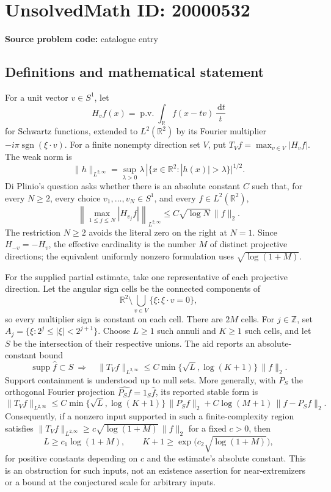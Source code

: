 \documentclass[11pt]{article}
\newcommand{\Z}{\mathbb{Z}}
\newcommand{\R}{\mathbb{R}}
\newcommand{\dd}{\,\mathrm{d}}
\begin{document}
\section*{UnsolvedMath ID: 20000532}
\textbf{Source problem code:} catalogue entry
\subsection{Definitions and mathematical statement}
For a unit vector \(v\in S^1\), let
\[
 H_vf(x)=\operatorname{p.v.}\int_\R f(x-tv)\,\frac{\dd t}{t}
\]
for Schwartz functions, extended to \(L^2(\R^2)\) by its Fourier multiplier \(-i\pi\operatorname{sgn}(\xi\cdot v)\). For a finite nonempty direction set \(V\), put \(T_Vf=\max_{v\in V}|H_vf|\). The weak norm is
\[
 \|h\|_{L^{2,\infty}}=\sup_{\lambda>0}\lambda\,|\{x\in\R^2:|h(x)|>\lambda\}|^{1/2}.
\]
Di Plinio's question asks whether there is an absolute constant \(C\) such that, for every \(N\geq2\), every choice \(v_1,\ldots,v_N\in S^1\), and every \(f\in L^2(\R^2)\),
\[
 \left\|\max_{1\leq j\leq N}|H_{v_j}f|\right\|_{L^{2,\infty}}\leq C\sqrt{\log N}\,\|f\|_2.
\]
The restriction \(N\geq2\) avoids the literal zero on the right at \(N=1\). Since \(H_{-v}=-H_v\), the effective cardinality is the number \(M\) of distinct projective directions; the equivalent uniformly nonzero formulation uses \(\sqrt{\log(1+M)}\).

For the supplied partial estimate, take one representative of each projective direction. Let the angular sign cells be the connected components of
\[
 \R^2\setminus\bigcup_{v\in V}\{\xi:\xi\cdot v=0\},
\]
so every multiplier sign is constant on each cell. There are \(2M\) cells. For \(j\in\Z\), set \(A_j=\{\xi:2^j\leq|\xi|<2^{j+1}\}\). Choose \(L\geq1\) such annuli and \(K\geq1\) such cells, and let \(S\) be the intersection of their respective unions. The aid reports an absolute-constant bound
\[
 \operatorname{supp}\widehat f\subset S\ \Longrightarrow\quad
 \|T_Vf\|_{L^{2,\infty}}\leq C\min\{\sqrt L,\log(K+1)\}\,\|f\|_2.
\]
Support containment is understood up to null sets. More generally, with \(P_S\) the orthogonal Fourier projection \(\widehat{P_Sf}=1_S\widehat f\), its reported stable form is
\[
 \|T_Vf\|_{L^{2,\infty}}\leq
 C\min\{\sqrt L,\log(K+1)\}\,\|P_Sf\|_2
 +C\log(M+1)\,\|f-P_Sf\|_2.
\]
Consequently, if a nonzero input supported in such a finite-complexity region satisfies
\(\|T_Vf\|_{L^{2,\infty}}\geq c\sqrt{\log(1+M)}\,\|f\|_2\) for a fixed \(c>0\), then
\[
 L\geq c_1\log(1+M),\qquad
 K+1\geq\exp\!\bigl(c_2\sqrt{\log(1+M)}\bigr),
\]
for positive constants depending on \(c\) and the estimate's absolute constant. This is an obstruction for such inputs, not an existence assertion for near-extremizers or a bound at the conjectured scale for arbitrary inputs.
\end{document}

